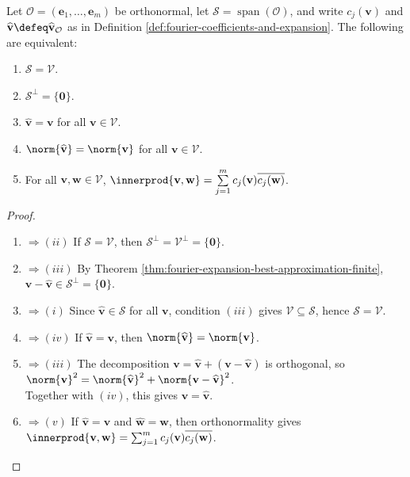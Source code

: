 \begin{theorem} \label{thm:finite-orthonormal-basis-characterizations} \\
Let $\mathcal{O}=(\mathbf{e}_1,\ldots,\mathbf{e}_m)$ be orthonormal, let $\mathcal{S}=\operatorname{span}(\mathcal{O})$, and write $c_j(\mathbf{v})$ and $\widehat{\mathbf{v}}\defeq\widehat{\mathbf{v}}_{\mathcal{O}}$ as in Definition \ref{def:fourier-coefficients-and-expansion}. The following are equivalent:
\begin{enumerate}[label=\roman*.]
\setlength{\itemsep}{0pt}
\item $\mathcal{S}=\mathcal{V}$.
\item $\mathcal{S}^{\perp}=\{\mathbf{0}\}$.
\item $\widehat{\mathbf{v}}=\mathbf{v}$ for all $\mathbf{v}\in\mathcal{V}$.
\item $\norm{\widehat{\mathbf{v}}}=\norm{\mathbf{v}}$ for all $\mathbf{v}\in\mathcal{V}$.
\item For all $\mathbf{v},\mathbf{w}\in\mathcal{V}$, $\innerprod{\mathbf{v},\mathbf{w}} = \sum\limits_{j=1}^{m}c_j(\mathbf{v})\overline{c_j(\mathbf{w})}$.
\end{enumerate}
\begin{proof}
\begin{enumerate}[label=(\roman*).]
\setlength{\itemsep}{0pt}
\item[$(i)$]$\Rightarrow (ii)$ If $\mathcal{S}=\mathcal{V}$, then $\mathcal{S}^{\perp}=\mathcal{V}^{\perp}=\{\mathbf{0}\}$.
\item[$(ii)$]$\Rightarrow (iii)$ By Theorem \ref{thm:fourier-expansion-best-approximation-finite}, $\mathbf{v}-\widehat{\mathbf{v}}\in\mathcal{S}^{\perp}=\{\mathbf{0}\}$.
\item[$(iii)$]$\Rightarrow (i)$ Since $\widehat{\mathbf{v}}\in\mathcal{S}$ for all $\mathbf{v}$, condition $(iii)$ gives $\mathcal{V}\subseteq\mathcal{S}$, hence $\mathcal{S}=\mathcal{V}$.
\item[$(iii)$]$\Rightarrow (iv)$ If $\widehat{\mathbf{v}}=\mathbf{v}$, then $\norm{\widehat{\mathbf{v}}}=\norm{\mathbf{v}}$.
\item[$(iv)$]$\Rightarrow (iii)$ The decomposition $\mathbf{v}=\widehat{\mathbf{v}}+(\mathbf{v}-\widehat{\mathbf{v}})$ is orthogonal, so $\norm{\mathbf{v}}^2=\norm{\widehat{\mathbf{v}}}^2+\norm{\mathbf{v}-\widehat{\mathbf{v}}}^2$.\\
Together with $(iv)$, this gives $\mathbf{v}=\widehat{\mathbf{v}}$.
\item[$(iii)$]$\Rightarrow (v)$ If $\widehat{\mathbf{v}}=\mathbf{v}$ and $\widehat{\mathbf{w}}=\mathbf{w}$, then orthonormality gives $\innerprod{\mathbf{v},\mathbf{w}}=\sum_{j=1}^{m}c_j(\mathbf{v})\overline{c_j(\mathbf{w})}$.

\end{enumerate}
\end{proof}
\end{theorem}
